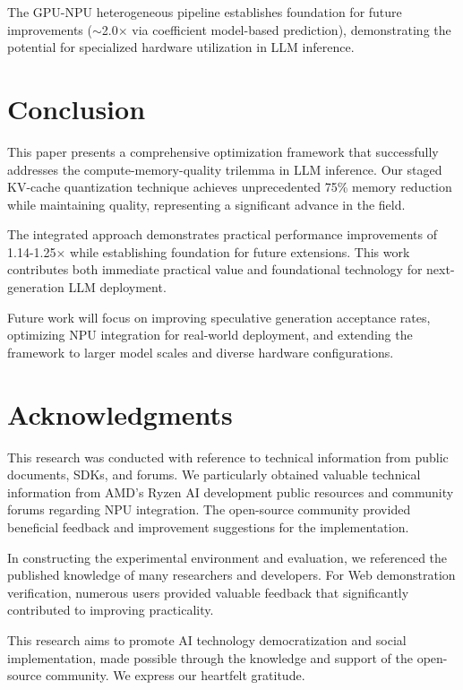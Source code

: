 \documentclass[twocolumn,10pt]{article}
\begin{document}
The GPU-NPU heterogeneous pipeline establishes foundation for future improvements ($\sim$2.0$\times$ via coefficient model-based prediction), demonstrating the potential for specialized hardware utilization in LLM inference.

\section{Conclusion}

This paper presents a comprehensive optimization framework that successfully addresses the compute-memory-quality trilemma in LLM inference. Our staged KV-cache quantization technique achieves unprecedented 75\% memory reduction while maintaining quality, representing a significant advance in the field.

The integrated approach demonstrates practical performance improvements of 1.14-1.25$\times$ while establishing foundation for future extensions. This work contributes both immediate practical value and foundational technology for next-generation LLM deployment.

Future work will focus on improving speculative generation acceptance rates, optimizing NPU integration for real-world deployment, and extending the framework to larger model scales and diverse hardware configurations.

\section{Acknowledgments}

This research was conducted with reference to technical information from public documents, SDKs, and forums. We particularly obtained valuable technical information from AMD's Ryzen AI development public resources and community forums regarding NPU integration. The open-source community provided beneficial feedback and improvement suggestions for the implementation.

In constructing the experimental environment and evaluation, we referenced the published knowledge of many researchers and developers. For Web demonstration verification, numerous users provided valuable feedback that significantly contributed to improving practicality.

This research aims to promote AI technology democratization and social implementation, made possible through the knowledge and support of the open-source community. We express our heartfelt gratitude.
\end{document}
